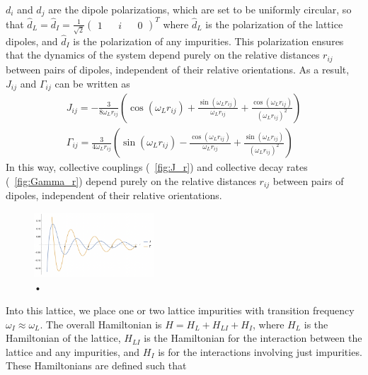 \documentclass[aps,pra,superscriptaddress,twocolumn]{revtex4-1}
\newcommand{\fref}[1]{\text{Fig.}~\ref{#1}}
\newcommand{\commentSB}[1]{\texttt{\color{blue}[#1]}}
\begin{document}
$d_i$ and $d_j$ are the dipole polarizations, which are set to be uniformly circular, so that $ \hat{d}_L = \hat{d}_I = \frac{1}{\sqrt{2}} \begin{pmatrix} 
    1 && i && 0 
\end{pmatrix} ^T
\label{eqn:polarization} $
where $\hat{d}_L$ is the polarization of the lattice dipoles, and $\hat{d}_I$ is the polarization of any impurities. This polarization ensures that the dynamics of the system depend purely on the relative distances $r_{ij}$ between pairs of dipoles, independent of their relative orientations. As a result, $J_{ij}$ and $\Gamma_{ij}$ can be written as 
\begin{subequations}
    \begin{align}
    J_{ij} = -\frac{3}{8 \omega_L r_{ij}} \left( \cos (\omega_L r_{ij}) + \frac{\sin (\omega_L r_{ij})}{\omega_L r_{ij}} + \frac{\cos (\omega_L r_{ij})}{(\omega_L r_{ij})^2} \right) \\
    \Gamma_{ij} = \frac{3}{4\omega_L r_{ij}} \left( \sin(\omega_L r_{ij}) - \frac{\cos(\omega_L r_{ij})}{\omega_L r_{ij}} + \frac{\sin(\omega_L r_{ij})}{(\omega_L r_{ij})^2} \right) 
    \end{align}
\end{subequations}
In this way, collective couplings (\fref{fig:J_r}) and collective decay rates (\fref{fig:Gamma_r}) depend purely on the relative distances $r_{ij}$ between pairs of dipoles, independent of their relative orientations. 
\begin{figure}
    \includegraphics[width=0.4\textwidth]{figures/J_and_Gamma.png} 
    \caption{•}
    \label{fig:J_and_Gamma.png}
\end{figure}
Into this lattice, we place one or two lattice impurities with transition frequency $\omega_I \approx \omega_L$. The overall Hamiltonian is $H = H_L + H_{LI} + H_{I}$, where $H_L$ is the Hamiltonian of the lattice, $H_{LI}$ is the Hamiltonian for the interaction between the lattice and any impurities, and $H_{I}$ is for the interactions involving just impurities. These Hamiltonians are defined such that  
\end{document}
